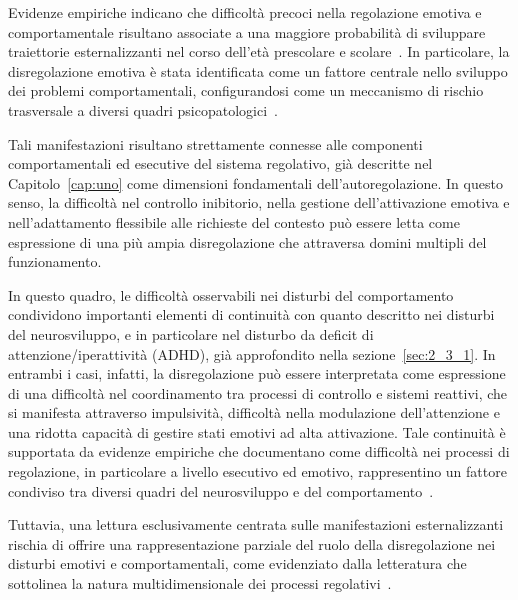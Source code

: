             Evidenze empiriche indicano che difficoltà precoci nella regolazione emotiva e comportamentale risultano associate a una maggiore probabilità di sviluppare traiettorie esternalizzanti nel corso dell'età prescolare e scolare~\cite{eisenberg2010,calkins2007hill,beauchaine2019}. In particolare, la disregolazione emotiva è stata identificata come un fattore centrale nello sviluppo dei problemi comportamentali, configurandosi come un meccanismo di rischio trasversale a diversi quadri psicopatologici~\cite{beauchaine2015,graziano2016}.

            Tali manifestazioni risultano strettamente connesse alle componenti comportamentali ed esecutive del sistema regolativo, già descritte nel Capitolo~\ref{cap:uno} come dimensioni fondamentali dell'autoregolazione. In questo senso, la difficoltà nel controllo inibitorio, nella gestione dell'attivazione emotiva e nell'adattamento flessibile alle richieste del contesto può essere letta come espressione di una più ampia disregolazione che attraversa domini multipli del funzionamento.

            In questo quadro, le difficoltà osservabili nei disturbi del comportamento condividono importanti elementi di continuità con quanto descritto nei disturbi del neurosviluppo, e in particolare nel disturbo da deficit di attenzione/iperattività (ADHD), già approfondito nella sezione~\ref{sec:2_3_1}. In entrambi i casi, infatti, la disregolazione può essere interpretata come espressione di una difficoltà nel coordinamento tra processi di controllo e sistemi reattivi, che si manifesta attraverso impulsività, difficoltà nella modulazione dell'attenzione e una ridotta capacità di gestire stati emotivi ad alta attivazione. Tale continuità è supportata da evidenze empiriche che documentano come difficoltà nei processi di regolazione, in particolare a livello esecutivo ed emotivo, rappresentino un fattore condiviso tra diversi quadri del neurosviluppo e del comportamento~\cite{sonugabarke2016,zelazo2020}.

            Tuttavia, una lettura esclusivamente centrata sulle manifestazioni esternalizzanti rischia di offrire una rappresentazione parziale del ruolo della disregolazione nei disturbi emotivi e comportamentali, come evidenziato dalla letteratura che sottolinea la natura multidimensionale dei processi regolativi~\cite{beauchaine2015,cole2004}.

